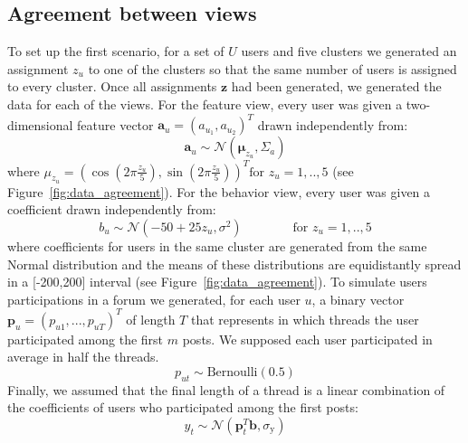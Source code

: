 \documentclass[smallextended]{svjour3}          %
\begin{document}
\subsection{Agreement between views}
To set up the first scenario, for a set of $U$ users and five clusters we generated an assignment $z_u$ to one of the clusters so that the same number of users is assigned to every cluster.
Once all assignments $\mathbf{z}$ had been generated, we generated the data for each of the views. For the feature view, every user was given a two-dimensional feature vector $\mathbf{a}_u=(a_{u_1}, a_{u_2})^T$ drawn independently from:
	\begin{equation}
	\mathbf{a}_u \sim \mathcal{N}\left(\boldsymbol{\mu}_{z_u}, \Sigma_a \right)
	\end{equation}
where
	$\mu_{z_u}=\left(\cos(2\pi \frac{z_u}{5}), \sin(2\pi \frac{z_u}{5})\right)^T \text{for } z_u=1,..,5$
(see Figure~\ref{fig:data_agreement}). For the behavior view, every user was given a coefficient drawn independently from:
\begin{equation}
b_u \sim \mathcal{N}(-50 +25z_u, \sigma^2) 
\qquad\qquad \text{for } z_u=1,..,5
\end{equation}
where coefficients for users in the same cluster are generated from the same Normal distribution and the means of these distributions are equidistantly spread in a [-200,200] interval (see Figure~\ref{fig:data_agreement}).
To simulate users participations in a forum we generated, for each user $u$, a binary vector $\mathbf{p}_u = (p_{u1},...,p_{uT})^T$ of length $T$ that represents in which threads the user participated among the first $m$ posts. We supposed each user participated in average in half the threads.
\begin{equation}
p_{ut} \sim \text{Bernoulli}(0.5)
\end{equation}
Finally, we assumed that the final length of a thread is a linear combination of the coefficients of users who participated among the first posts:
	\begin{equation}
	y_t \sim \mathcal{N}(\mathbf{p}_t^T \mathbf{b}, \sigma_\text{y})
	\end{equation}
\end{document}
